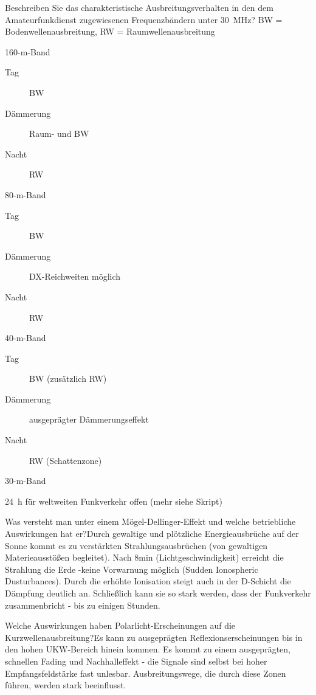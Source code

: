 \documentclass[avery5371,grid,frame,a4paper]{flashcards}
\newcommand{\card}[3]{
  \begin{flashcard}[{\chap} -- #1]{#2}#3\end{flashcard}
}
\begin{document}
\card{26}{Beschreiben Sie das charakteristische Ausbreitungsverhalten in den dem Amateurfunkdienst zugewiesenen Frequenzbändern unter 30~MHz?}{
  \footnotesize
  BW = Bodenwellenausbreitung, RW = Raumwellenausbreitung
  \begin{minipage}{0.5\textwidth}
    \centerline{160-m-Band}
      \begin{description}
        \item[Tag] BW
        \item[Dämmerung] Raum- und BW
        \item[Nacht] RW
      \end{description}

    \centerline{80-m-Band}
      \begin{description}
        \item[Tag] BW
        \item[Dämmerung] DX-Reichweiten möglich
        \item[Nacht] RW
      \end{description}
  \end{minipage}
  \begin{minipage}{0.48\textwidth}
    \centerline{40-m-Band}
      \begin{description}
        \item[Tag] BW (zusätzlich RW)
        \item[Dämmerung] ausgeprägter Dämmerungseffekt
        \item[Nacht] RW (Schattenzone)
      \end{description}

    \centerline{30-m-Band}
    24~h für weltweiten Funkverkehr offen (mehr siehe Skript)
  \end{minipage}
}
\card{27}{Was versteht man unter einem Mögel-Dellinger-Effekt und welche betriebliche Auswirkungen hat er?}{Durch gewaltige und plötzliche Energieausbrüche auf der Sonne kommt es zu verstärkten Strahlungsausbrüchen (von gewaltigen Materieausstößen begleitet). Nach 8min (Lichtgeschwindigkeit) erreicht die Strahlung die Erde -keine Vorwarnung möglich (Sudden Ionospheric Dusturbances). Durch die erhöhte Ionisation steigt auch in der D-Schicht die Dämpfung deutlich an. Schließlich kann sie so stark werden, dass der Funkverkehr zusammenbricht - bis zu einigen Stunden.}
\card{28}{Welche Auswirkungen haben Polarlicht-Erscheinungen auf die Kurzwellenausbreitung?}{Es kann zu ausgeprägten Reflexionserscheinungen bis in den hohen UKW-Bereich hinein kommen. Es kommt zu einem ausgeprägten, schnellen Fading und Nachhalleffekt - die Signale sind selbst bei hoher Empfangsfeldstärke fast unlesbar. Ausbreitungswege, die durch diese Zonen führen, werden stark beeinflusst.}
\end{document}
